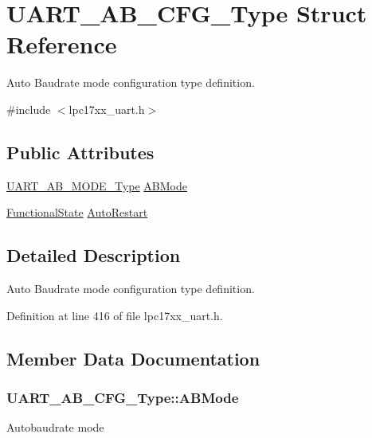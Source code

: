 \hypertarget{struct_u_a_r_t___a_b___c_f_g___type}{}\section{U\+A\+R\+T\+\_\+\+A\+B\+\_\+\+C\+F\+G\+\_\+\+Type Struct Reference}
\label{struct_u_a_r_t___a_b___c_f_g___type}


Auto Baudrate mode configuration type definition.  




{\ttfamily \#include $<$lpc17xx\+\_\+uart.\+h$>$}

\subsection*{Public Attributes}
\begin{DoxyCompactItemize}
\item 
\hyperlink{group___u_a_r_t___public___types_ga0a6689108a4f3651d2188ea8a2c17d4a}{U\+A\+R\+T\+\_\+\+A\+B\+\_\+\+M\+O\+D\+E\+\_\+\+Type} \hyperlink{struct_u_a_r_t___a_b___c_f_g___type_adc6d9350cdcf1474f1f6e3263929f86d}{A\+B\+Mode}
\item 
\hyperlink{agilefox_2library_2inc_2stm32f10x__type_8h_ac9a7e9a35d2513ec15c3b537aaa4fba1}{Functional\+State} \hyperlink{struct_u_a_r_t___a_b___c_f_g___type_acd37001da8b70352858651e359dbbd65}{Auto\+Restart}
\end{DoxyCompactItemize}


\subsection{Detailed Description}
Auto Baudrate mode configuration type definition. 

Definition at line 416 of file lpc17xx\+\_\+uart.\+h.



\subsection{Member Data Documentation}
\subsubsection[{\texorpdfstring{A\+B\+Mode}{ABMode}}]{ U\+A\+R\+T\+\_\+\+A\+B\+\_\+\+C\+F\+G\+\_\+\+Type\+::\+A\+B\+Mode}\hypertarget{struct_u_a_r_t___a_b___c_f_g___type_adc6d9350cdcf1474f1f6e3263929f86d}{}\label{struct_u_a_r_t___a_b___c_f_g___type_adc6d9350cdcf1474f1f6e3263929f86d}
Autobaudrate mode 

